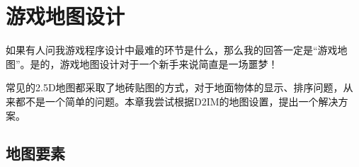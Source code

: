 \chapter{游戏地图设计}
如果有人问我游戏程序设计中最难的环节是什么，那么我的回答一定是“游戏地图”。是的，游戏地图设计对于一个新手来说简直是一场噩梦！

常见的2.5D地图都采取了地砖贴图的方式，对于地面物体的显示、排序问题，从来都不是一个简单的问题。本章我尝试根据D2IM的地图设置，提出一个解决方案。
\newpage
\section{地图要素}
